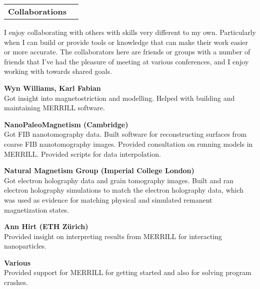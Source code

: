 \documentclass[11pt]{article}
\makeatletter
\newenvironment{resumeSubSectionHeader}{
    \par
    \begin{tabular*}{\textwidth}{l@{\extracolsep{\fill}}r}
    \par
} {
    \end{tabular*}
    \par
}
\newenvironment{resumeSubSectionBody}{
    \par
    \vspace{-0.8\parskip}
    \begin{small}
    \par
} {
    \par
    \end{small}
    \par
}
\makeatother
\begin{document}
\begin{resumeSubSectionHeader}
    \textbf{Collaborations}
\end{resumeSubSectionHeader}
\begin{resumeSubSectionBody}
I enjoy collaborating with others with skills very different to my own.
Particularly when I can build or provide tools or knowledge that can make their
work easier or more accurate.
The collaborators here are friends or groups with a number of friends that I've
had the pleasure of meeting at various conferences, and I enjoy working with
towards shared goals.
\begin{description}

    \item{\bf Wyn Williams, Karl Fabian}\\
        Got insight into magnetostriction and modelling.
        Helped with building and maintaining MERRILL software.

    \item{\bf NanoPaleoMagnetism (Cambridge)}\\
        Got FIB nanotomography data.
        Built software for reconstructing surfaces from coarse FIB
        nanotomography images.
        Provided consultation on running models in MERRILL.
        Provided scripts for data interpolation.

    \item{\bf Natural Magnetism Group (Imperial College London)}\\
        Got electron holography data and grain tomography images.
        Built and ran electron holography simulations to match the electron
        holography data, which was used as evidence for matching physical and
        simulated remanent magnetization states.

    \item{\bf Ann Hirt (ETH Z\"urich)}\\
        Provided insight on interpreting results from MERRILL for interacting
        nanoparticles.

    \item{\bf Various}\\
        Provided support for MERRILL for getting started and also for solving
        program crashes.

\end{description}
\end{resumeSubSectionBody}



\end{document}
